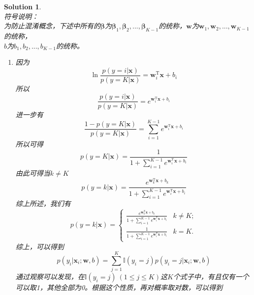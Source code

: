 \documentclass[a4paper,UTF8]{article}
\numberwithin{equation}{section}
\newtheorem*{solution}{Solution}
\begin{document}
\begin{solution}
~\\
符号说明：\\
为防止混淆概念，下述中所有的$\boldsymbol{\beta}$为$\boldsymbol{\beta}_1, \boldsymbol{\beta}_2,...,\boldsymbol{\beta}_{K-1}$的统称，$\mathbf{w}$为$\mathbf{w}_1, \mathbf{w}_2,...,\mathbf{w}_{K-1}$的统称，\\
$b$为$b_1, b_2,..., b_{K-1}$的统称。\\
\begin{enumerate}
	
\item
因为
\begin{equation}
	\ln\frac{p(y=i|\mathbf{x})}{p(y=K|\mathbf{x})}=\mathbf{w}_i^\mathrm{T}\mathbf{x}+b_i
\end{equation} 	
所以
\begin{equation}
	\frac{p(y=i|\mathbf{x})}{p(y=K|\mathbf{x})} = e^{\mathbf{w}_i^\mathrm{T}\mathbf{x}+b_i}
\end{equation}
进一步有
\begin{equation}
	\frac{1-p(y=K|\mathbf{x})}{p(y=K|\mathbf{x})} = \sum_{i=1}^{K-1}e^{\mathbf{w}_i^\mathrm{T}\mathbf{x}+b_i}
\end{equation}
所以可得
\begin{equation}
	p(y=K|\mathbf{x}) = \frac{1}{1 + \sum_{i=1}^{K-1}e^{\mathbf{w}_i^\mathrm{T}\mathbf{x}+b_i}}
\end{equation}
由此可得当$k\neq K$
\begin{equation}
	p(y=k|\mathbf{x}) = \frac{e^{\mathbf{w}_k^\mathrm{T}\mathbf{x}+b_k}}{1 + \sum_{i=1}^{K-1}e^{\mathbf{w}_i^\mathrm{T}\mathbf{x}+b_i}}
\end{equation}
综上所述，我们有
\begin{equation}
		p(y=k|\mathbf{x}) = \begin{cases}
		\frac{e^{\mathbf{w}_k^\mathrm{T}\mathbf{x}+b_k}}{1 + \sum_{i=1}^{K-1}e^{\mathbf{w}_i^\mathrm{T}\mathbf{x}+b_i}} & k\neq K;\\
		\frac{1}{1 + \sum_{i=1}^{K-1}e^{\mathbf{w}_i^\mathrm{T}\mathbf{x}+b_i}} & k = K.
		\end{cases}
\end{equation}
综上，可以得到
\begin{equation}
p(y_i|\mathbf{x}_i;\mathbf{w}, b) = \sum_{j=1}^{K}\mathbb{I}(y_i=j) p(y_i=j|\mathbf{x}_i;\mathbf{w}, b)
\end{equation}
通过观察可以发现，在$\mathbb{I}(y_i=j)\ (1 \leq j \leq K)$这$K$个式子中，有且仅有一个可以取1，其他全部为0。根据这个性质，再对概率取对数，可以得到

\end{enumerate}
\end{solution}
\end{document}
